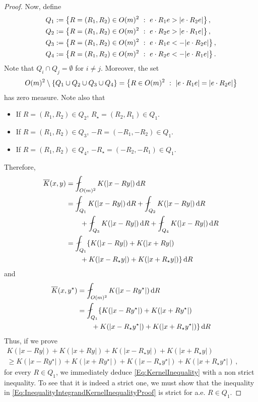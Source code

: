 \begin{proof}
Now, define
\begin{align*}
Q_1 &:= \left \{ R = (R_1,R_2) \in O(m)^2 \ : \ e\cdot R_1 e > |e\cdot R_2 e| \right \},\\
Q_2 &:= \left \{ R = (R_1,R_2) \in O(m)^2 \ : \ e\cdot R_2 e > |e\cdot R_1 e| \right \},\\
Q_3 &:= \left \{ R = (R_1,R_2) \in O(m)^2 \ : \ e\cdot R_1 e < -|e\cdot R_2 e| \right \},\\
Q_4 &:= \left \{ R = (R_1,R_2) \in O(m)^2 \ : \ e\cdot R_2 e < - |e\cdot R_1 e| \right \}.
\end{align*}
Note that $Q_i \cap Q_j = \emptyset$ for $i\neq j$. Moreover, the set
$$
O(m)^2 \setminus \{Q_1 \cup Q_2 \cup Q_3 \cup Q_4\} = \left \{ R\in O(m)^2 \ : \ |e\cdot R_1 e| = |e\cdot R_2 e| \right \}
$$
has zero measure. Note also that
\begin{itemize}
\item If $R = (R_1, R_2)\in Q_2$, $R_\star = (R_2, R_1) \in Q_1$.
\item If $R = (R_1, R_2)\in Q_3$, $-R = (-R_1, -R_2) \in Q_1$.
\item If $R = (R_1, R_2)\in Q_4$, $-R_\star = (-R_2, -R_1) \in Q_1$.
\end{itemize}
Therefore,
\begin{align*}
\overline{K} (x, y) &= \average_{O(m)^2} K(|x - R y|)\d R \\
& = \average_{Q_1} K(|x - R y|)\d R + \average_{Q_2} K(|x - R y|)\d R \\
& \quad \quad
+ \average_{Q_3} K(|x - R y|)\d R +
\average_{Q_4} K(|x - R y|)\d R \\
&= \average_{Q_1} \{K(|x - R y|) + K(|x + R y|) \\
&\quad \quad + K(|x - R_\star y|) + K(|x + R_\star y|)\}\d R
\end{align*}
and
\begin{align*}
\overline{K} (x, y^\star) &= \average_{O(m)^2} K(|x - R y^\star|)\d R \\
& = \average_{Q_1} \{K(|x - R y^\star|) + K(|x + R y^\star|) \\
&\quad \quad + K(|x - R_\star y^\star|) + K(|x + R_\star y^\star|)\}\d R
\end{align*}
Thus, if we prove
\begin{equation}
\label{Eq:InequalityIntegrandKernelInequalityProof}
\begin{split}
K(|x - R y|) + K(|x + R y|) + K(|x - R_\star y|) + K(|x + R_\star y|)
\quad \quad \quad \quad \quad \quad \quad \quad
\\
\geq
K(|x - R y^\star|) + K(|x + R y^\star|)+K(|x - R_\star y^\star|) + K(|x + R_\star y^\star|)\,,
\end{split}
\end{equation}
for every $R\in Q_1$, we immediately deduce \eqref{Eq:KernelInequality} with a non strict inequality. To see that it is indeed a strict one, we must show that the inequality in \eqref{Eq:InequalityIntegrandKernelInequalityProof} is strict for a.e. $R \in Q_1$.



\end{proof}
